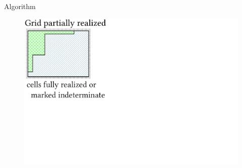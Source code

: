 \documentclass{beamer}
\begin{document}






  \begin{frame}[fragile]{Algorithm}
    \begin{figure}
      \includegraphics[width=\textwidth]{figs/poms_alg0.pdf}
    \end{figure}
  \end{frame}
\end{document}
